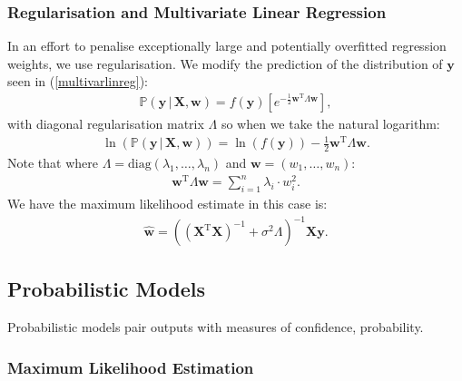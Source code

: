 \subsubsection{Regularisation and Multivariate Linear Regression}

In an effort to penalise exceptionally large and potentially
overfitted regression weights, we use regularisation.
We modify the prediction of the distribution of $\mathbf{y}$
seen in (\ref{multivarlinreg}): \begin{gather*}
    \mathbb{P}(\mathbf{y} \, | \, \mathbf{X}, \mathbf{w}) 
    = f(\mathbf{y})
    \left[
        e^{-\frac{1}{2}\mathbf{w}^\text{T} \Lambda \mathbf{w}}
    \right],
\end{gather*} with diagonal regularisation matrix $\Lambda$ 
so when we take the natural logarithm: \begin{gather*}
    \ln(\mathbb{P}(\mathbf{y} \, | \, \mathbf{X}, \mathbf{w})) 
    = \ln(f(\mathbf{y}))
        - \frac{1}{2}\mathbf{w}^\text{T} \Lambda \mathbf{w}.
\end{gather*} Note that where $\Lambda = \text{diag}(\lambda_1,
\ldots, \lambda_n)$ and $\mathbf{w} = (w_1, \ldots, w_n)$: 
\begin{gather*}
    \mathbf{w}^\text{T} \Lambda \mathbf{w} 
    = \sum_{i = 1}^n \lambda_i \cdot w_i^2.
\end{gather*} We have the maximum likelihood estimate in this case
is: \begin{gather*}
    \mathbf{\hat{w}} = ((\mathbf{X}^{\text{T}}\mathbf{X})^{-1}
    + \sigma^2 \Lambda)^{-1}\mathbf{X}\mathbf{y}.
\end{gather*}

\subsection{Probabilistic Models}

Probabilistic models pair outputs with measures of confidence,
probability.

\subsubsection{Maximum Likelihood Estimation}

